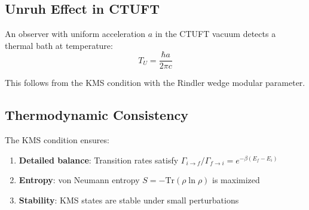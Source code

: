 \subsection{Unruh Effect in CTUFT}

\begin{theorem}
An observer with uniform acceleration $a$ in the CTUFT vacuum detects a thermal bath at temperature:
\begin{equation}
    T_U = \frac{\hbar a}{2\pi c}
\end{equation}
\end{theorem}

This follows from the KMS condition with the Rindler wedge modular parameter.

\subsection{Thermodynamic Consistency}

The KMS condition ensures:
\begin{enumerate}
    \item \textbf{Detailed balance}: Transition rates satisfy $\Gamma_{i \to f}/\Gamma_{f \to i} = e^{-\beta(E_f - E_i)}$
    \item \textbf{Entropy}: von Neumann entropy $S = -\text{Tr}(\rho \ln \rho)$ is maximized
    \item \textbf{Stability}: KMS states are stable under small perturbations
\end{enumerate}
